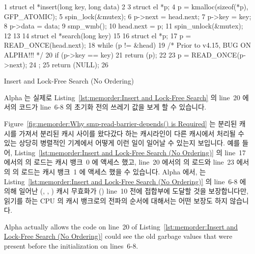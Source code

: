\begin{listing}[tbp]
{ \scriptsize
\begin{verbbox}
  1 struct el *insert(long key, long data)
  2 {
  3     struct el *p;
  4     p = kmalloc(sizeof(*p), GFP_ATOMIC);
  5     spin_lock(&mutex);
  6     p->next = head.next;
  7     p->key = key;
  8     p->data = data;
  9     smp_wmb();
 10     head.next = p;
 11     spin_unlock(&mutex);
 12 }
 13
 14 struct el *search(long key)
 15 {
 16     struct el *p;
 17     p = READ_ONCE(head.next);
 18     while (p != &head) {
 19         /* Prior to v4.15, BUG ON ALPHA!!! */
 20         if (p->key == key) {
 21             return (p);
 22         }
 23         p = READ_ONCE(p->next);
 24     };
 25     return (NULL);
 26 }
\end{verbbox}
}
\centering
\theverbbox
\caption{Insert and Lock-Free Search (No Ordering)}
\label{lst:memorder:Insert and Lock-Free Search (No Ordering)}
\end{listing}

Alpha 는 실제로
Listing~\ref{lst:memorder:Insert and Lock-Free Search} 의 line~20 에서의 코드가
line~6-8 의 초기화 전의 쓰레기 값을 보게 할 수 있습니다.

Figure~\ref{fig:memorder:Why smp-read-barrier-depends() is Required}
는 분리된 캐시를 가져서 분리된 캐시 사이를 왔다갔다 하는 캐시라인이 다른
캐시에서 처리될 수 있는 상당히 병렬적인 기계에서 어떻게 이런 일이 일어날 수
있는지 보입니다.
예를 들어,
Listing~\ref{lst:memorder:Insert and Lock-Free Search (No Ordering)}
의 line~17 에서의  의 로드는 캐시 뱅크~0 에 액세스 했고, line~20
에서의  의 로드와 line~23 에서의  의 로드는 캐시 뱅크~1
에 액세스 했을 수 있습니다.
Alpha 에서,  는
Listing~\ref{lst:memorder:Insert and Lock-Free Search (No Ordering)} 의
line~6-8 에 의해 일어난 (, , ) 캐시 무효화가
() line~10 전에 접합부에 도달할 것을 보장합니다만, 읽기를 하는
CPU 의 캐시 뱅크로의 전파의 순서에 대해서는 어떤 보장도 하지 않습니다.
\iffalse

Alpha actually allows the code on line~20 of
Listing~\ref{lst:memorder:Insert and Lock-Free Search (No Ordering)}
could see the old
garbage values that were present before the initialization on lines~6-8.

